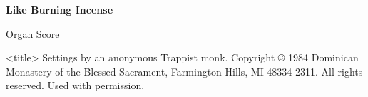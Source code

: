\documentclass{lbi_cantor_bind}
\begin{document}
\thispagestyle{empty}

\begin{center}
    \null\vfill
    \Large\bfseries
    Like Burning Incense

    \normalfont\Large
    \vspace{2\baselineskip}Organ Score

    \vspace{1\baselineskip}<title>
    \vfill\vfill\vfill
    \small
    Settings by an anonymous Trappist monk. Copyright © 1984 Dominican Monastery of the Blessed Sacrament, Farmington Hills, MI 48334-2311. All rights reserved. Used with permission.
\end{center}

\newpage



\newpage\null\newpage


\end{document}
